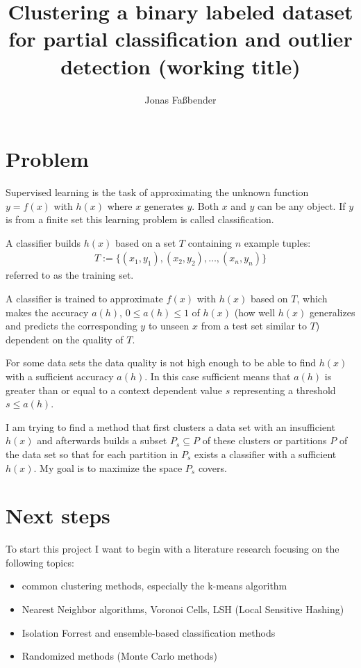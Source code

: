 \documentclass[12pt]{article}
\title{Clustering a binary labeled dataset for
  partial classification and outlier detection (working title)}
\author{Jonas Fa{\ss}bender}
\date{}
\begin{document}
\maketitle

\section{Problem}

Supervised learning is the task of approximating the
unknown function $y = f(x)$ with $h(x)$ where $x$ generates
$y$. Both $x$ and $y$ can be any object. If $y$ is from a
finite set this learning problem is called classification.

A classifier builds $h(x)$ based on a set $T$ containing
$n$ example tuples:
\begin{align*}
T := \{(x_1, y_1), (x_2, y_2), \dots ,(x_n,y_n)\}
\end{align*}
referred to as the training set.\cite{ki}

A classifier is trained to approximate $f(x)$ with $h(x)$
based on $T$, which makes the accuracy $a(h)$,
$0 \leq a(h) \leq 1$ of $h(x)$ (how well $h(x)$ generalizes
and predicts the corresponding $y$ to unseen $x$ from a
test set similar to $T$) dependent on the quality of
$T$.\cite{tc_data}

For some data sets the data quality is not high
enough to be able to find $h(x)$ with a sufficient
accuracy $a(h)$. In this case sufficient means that $a(h)$
is greater than or equal to a context dependent value $s$
representing a threshold $s \leq a(h)$.

I am trying to find a method that first clusters a data set
with an insufficient $h(x)$ and afterwards builds a subset
$P_s \subseteq P$ of these clusters or partitions $P$ of
the data set so that for each partition in $P_s$ exists a
classifier with a sufficient $h(x)$. My goal is to maximize
the space $P_s$ covers.

\section{Next steps}

To start this project I want to begin with a literature
research focusing on the following topics:

\begin{itemize}

  \item common clustering methods, especially the k-means
        algorithm

  \item Nearest Neighbor algorithms, Voronoi Cells, LSH
        (Local Sensitive Hashing)

  \item Isolation Forrest and ensemble-based classification
        methods

  \item Randomized methods (Monte Carlo methods)

\end{itemize}


\end{document}
